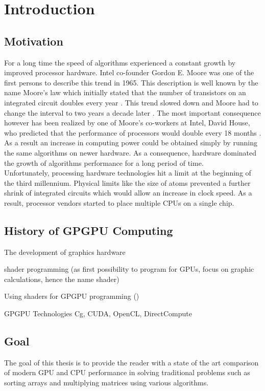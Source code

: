 \section{Introduction}


\subsection{Motivation}

For a long time the speed of algorithms experienced a constant growth by improved processor hardware. Intel co-founder Gordon E. Moore was one of the first persons to describe this trend in 1965. This description is well known by the name Moore's law which initially stated that the number of transistors on an integrated circuit doubles every year \cite{moore_law}. This trend slowed down and Moore had to change the interval to two years a decade later \cite{moore_law_2003}. The most important consequence however has been realized by one of Moore's co-workers at Intel, David House, who predicted that the performance of processors would double every 18 months \cite{moore_law_2003}. As a result an increase in computing power could be obtained simply by running the same algorithms on newer hardware. As a consequence, hardware dominated the growth of algorithms performance for a long period of time.
\\
Unfortunately, processing hardware technologies hit a limit at the beginning of the third millennium. Physical limits like the size of atoms prevented a further shrink of integrated circuits which would allow an increase in clock speed. As a result, processor vendors started to place multiple CPUs on a single chip. 



\subsection{History of GPGPU Computing}
The development of graphics hardware

shader programming (as first possibility to program for GPUs, focus on graphic calculations, hence the name shader)

Using shaders for GPGPU programming ()

GPGPU Technologies
Cg, CUDA, OpenCL, DirectCompute



\subsection{Goal}
The goal of this thesis is to provide the reader with a state of the art comparison of modern GPU and CPU performance in solving traditional problems such as sorting arrays and multiplying matrices using various algorithms.


